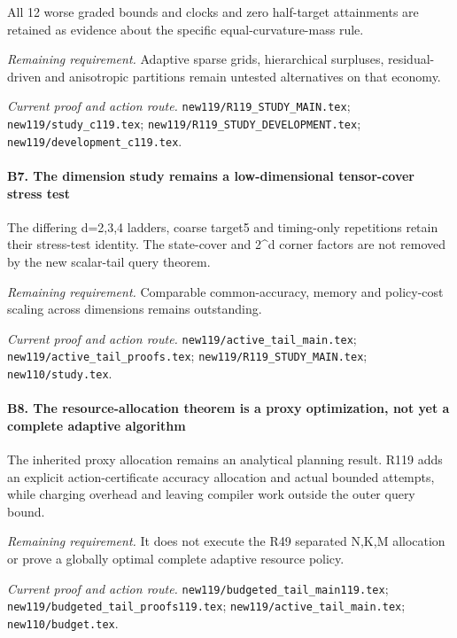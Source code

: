 All 12 worse graded bounds and clocks and zero half-target attainments are retained as evidence about the specific equal-curvature-mass rule.

\par\emph{Remaining requirement.} Adaptive sparse grids, hierarchical surpluses, residual-driven and anisotropic partitions remain untested alternatives on that economy.

\par\emph{Current proof and action route.} \nolinkurl{new119/R119_STUDY_MAIN.tex}; \nolinkurl{new119/study_c119.tex}; \nolinkurl{new119/R119_STUDY_DEVELOPMENT.tex}; \nolinkurl{new119/development_c119.tex}.

\paragraph{B7. The dimension study remains a low-dimensional tensor-cover stress test}

The differing d=2,3,4 ladders, coarse target5 and timing-only repetitions retain their stress-test identity. The state-cover and 2\textasciicircum{}d corner factors are not removed by the new scalar-tail query theorem.

\par\emph{Remaining requirement.} Comparable common-accuracy, memory and policy-cost scaling across dimensions remains outstanding.

\par\emph{Current proof and action route.} \nolinkurl{new119/active_tail_main.tex}; \nolinkurl{new119/active_tail_proofs.tex}; \nolinkurl{new119/R119_STUDY_MAIN.tex}; \nolinkurl{new110/study.tex}.

\paragraph{B8. The resource-allocation theorem is a proxy optimization, not yet a complete adaptive algorithm}

The inherited proxy allocation remains an analytical planning result. R119 adds an explicit action-certificate accuracy allocation and actual bounded attempts, while charging overhead and leaving compiler work outside the outer query bound.

\par\emph{Remaining requirement.} It does not execute the R49 separated N,K,M allocation or prove a globally optimal complete adaptive resource policy.

\par\emph{Current proof and action route.} \nolinkurl{new119/budgeted_tail_main119.tex}; \nolinkurl{new119/budgeted_tail_proofs119.tex}; \nolinkurl{new119/active_tail_main.tex}; \nolinkurl{new110/budget.tex}.

